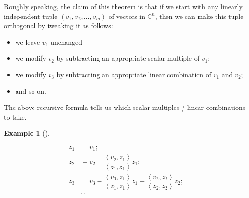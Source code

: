 \documentclass[numbers=enddot,12pt,final,onecolumn,notitlepage]{scrartcl}%
\numberwithin{exer}{subsection}
\theoremstyle{definition}
\newtheorem{exam}[theo]{Example}
\newenvironment{example}[1][]
{\begin{exam}[#1]\begin{leftbar}}
{\end{leftbar}\end{exam}}
\begin{document}
Roughly speaking, the claim of this theorem is that if we start with any
linearly independent tuple $\left(  v_{1},v_{2},\ldots,v_{m}\right)  $ of
vectors in $\mathbb{C}^{n}$, then we can make this tuple orthogonal by
tweaking it as follows:

\begin{itemize}
\item we leave $v_{1}$ unchanged;

\item we modify $v_{2}$ by subtracting an appropriate scalar multiple of
$v_{1}$;

\item we modify $v_{3}$ by subtracting an appropriate linear combination of
$v_{1}$ and $v_{2}$;

\item and so on.
\end{itemize}

The above recursive formula tells us which scalar multiples / linear
combinations to take.

\begin{example}%
\begin{align*}
z_{1}  & =v_{1};\\
z_{2}  & =v_{2}-\dfrac{\left\langle v_{2},z_{1}\right\rangle }{\left\langle
z_{1},z_{1}\right\rangle }z_{1};\\
z_{3}  & =v_{3}-\dfrac{\left\langle v_{3},z_{1}\right\rangle }{\left\langle
z_{1},z_{1}\right\rangle }z_{1}-\dfrac{\left\langle v_{3},z_{2}\right\rangle
}{\left\langle z_{2},z_{2}\right\rangle }z_{2};\\
& \ldots
\end{align*}

\end{example}
\end{document}

